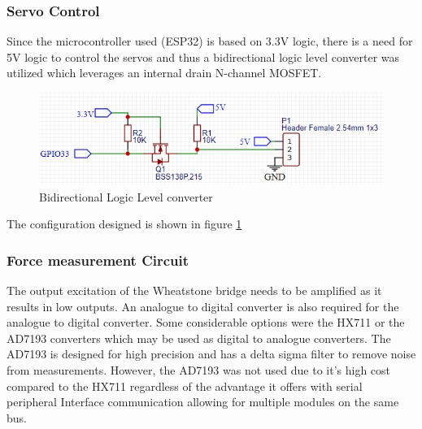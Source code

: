 \subsubsection{Servo Control}
Since the microcontroller used (ESP32) is based on 3.3V logic, there is a need for 5V logic to control the servos and thus a bidirectional logic level converter was utilized which leverages an internal drain N-channel MOSFET.
\begin{center}
	\begin{figure}[H]
		\centering
		\includegraphics{Figures/logik}
		\caption[Bidirectional Logic Level converter]{Bidirectional Logic Level converter}
		\label{fig:logik}
	\end{figure}
\end{center}
The configuration designed is shown in figure \ref{fig:logik}

\subsubsection{Force measurement Circuit}

The output excitation of the Wheatstone bridge needs to be amplified as it results in low outputs. An analogue to digital converter is also required for the analogue to digital converter. Some considerable options were the HX711 or the AD7193 converters which may be used as digital to analogue converters. The AD7193 is designed for high precision and has a delta sigma filter to remove noise from measurements.  
However, the AD7193 was not used due to it's high cost compared to the HX711 regardless of the advantage it offers with serial peripheral Interface communication allowing for multiple modules on the same bus.

